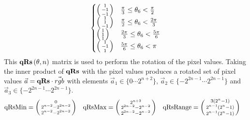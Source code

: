 \begin{gather*}
\begin{aligned}
\begin{cases}
\left( \begin{smallmatrix}  1 \\  -1 \\ -1\\ \end{smallmatrix} \right) & \frac{  \pi }{3} \leq  \theta_6  < \frac{   \pi }{2} \\
\left( \begin{smallmatrix}  1 \\    1 \\ -1\\ \end{smallmatrix} \right) & \frac{  \pi }{2} \leq  \theta_6  < \frac{2 \pi }{3} \\
\left( \begin{smallmatrix}  1 \\    1 \\   1\\ \end{smallmatrix} \right) & \frac{2\pi }{3} \leq  \theta_6  < \frac{5 \pi }{6} \\
\left( \begin{smallmatrix}  1 \\  -1 \\   1\\ \end{smallmatrix} \right) & \frac{5\pi }{6} \leq  \theta_6  <             \pi  \\
\end{cases} 
\end{aligned} \\
\end{gather*}
This $\qRs[\theta, n]$ matrix is used to perform the rotation of the pixel values. Taking the inner product of $\qRs$ with the pixel values produces 
a rotated set of pixel values $\vec{a} = \qRs \cdot \vec{rgb}$ with elements $ \vec{a}_1 \in \{0 \cdots 2^{n+2} \}$,  $ \vec{a}_2 \in \{-2^{2n-1} \cdots 2^{2n-1} \}$ and $ \vec{a}_3 \in \{-2^{2n-1} \cdots 2^{2n-1} \}$. 
\begin{align*}
\text{qRsMin}     &= \left( \begin{smallmatrix}  0           \\  2^{n-2}-2^{2 n-2} \\ 2^{n-2}-2^{2 n-2}\\ \end{smallmatrix} \right) & 
\text{qRsMax}    &= \left( \begin{smallmatrix}  2^{n+2} \\    2^{2 n-2}-2^{n-2}  \\   2^{2 n-2}-2^{n-2} \\ \end{smallmatrix} \right) & 
\text{qRsRange} &= \left( \begin{smallmatrix} 3 (2^n - 1) \\   2^{n-1} \left(2^n-1\right)      \\   2^{n-1} \left(2^n-1\right)     \\ \end{smallmatrix} \right) 
\end{align*}
